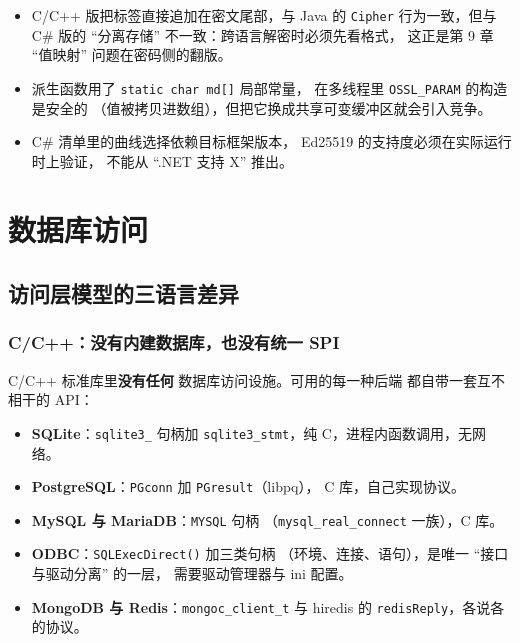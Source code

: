 \documentclass[12pt,a4paper,fontset=fandol]{ctexbook}
\newcommand{\Fn}[1]{\texttt{#1()}}
\newcommand{\Tp}[1]{\texttt{#1}}
\newcommand{\CSharp}{C\#}
\newcommand{\CppJava}{C/C++}
\begin{document}
\begin{warning}[title=这段清单里被故意留下的 ``工程不完美'']
\begin{itemize}
  \item \CppJava{} 版把标签直接追加在密文尾部，与 Java 的
        \Tp{Cipher} 行为一致，但与 \CSharp{} 版的 ``分离存储''
        不一致：跨语言解密时必须先看格式，
        这正是第 9 章 ``值映射'' 问题在密码侧的翻版。
  \item 派生函数用了 \Tp{static char md[]} 局部常量，
        在多线程里 \Tp{OSSL\_PARAM} 的构造是安全的
        （值被拷贝进数组），但把它换成共享可变缓冲区就会引入竞争。
  \item \CSharp{} 清单里的曲线选择依赖目标框架版本，
        Ed25519 的支持度必须在实际运行时上验证，
        不能从 ``.NET 支持 X'' 推出。
\end{itemize}
\end{warning}


\part{数据库访问}

\chapter{访问层模型的三语言差异}

\section{\CppJava{}：没有内建数据库，也没有统一 SPI}

\CppJava{} 标准库里\textbf{没有任何} 数据库访问设施。可用的每一种后端
都自带一套互不相干的 API：

\begin{itemize}
  \item \textbf{SQLite}：\Tp{sqlite3\_\allowbreak*} 句柄加
        \Tp{sqlite3\_stmt}，纯 C，进程内函数调用，无网络。
  \item \textbf{PostgreSQL}：\Tp{PGconn} 加 \Tp{PGresult}（libpq），
        C 库，自己实现协议。
  \item \textbf{MySQL 与 MariaDB}：\Tp{MYSQL} 句柄
        （\Tp{mysql\_real\_connect} 一族），C 库。
  \item \textbf{ODBC}：\Fn{SQLExecDirect} 加三类句柄
        （环境、连接、语句），是唯一 ``接口与驱动分离'' 的一层，
        需要驱动管理器与 ini 配置。
  \item \textbf{MongoDB 与 Redis}：\Tp{mongoc\_client\_t} 与
        hiredis 的 \Tp{redisReply}，各说各的协议。
\end{itemize}
\end{document}
